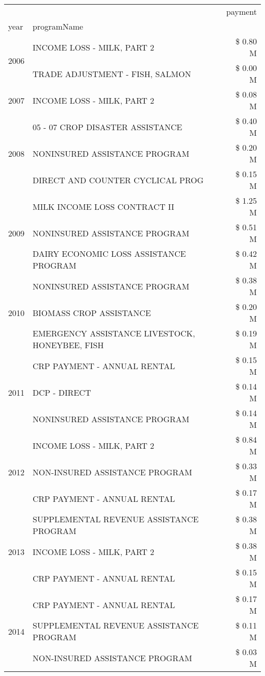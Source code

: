 \begin{tabular}{llr}
\toprule
 &  & payment \\
year & programName &  \\
\midrule
\multirow[t]{2}{*}{2006} & INCOME LOSS - MILK, PART 2 & \$ 0.80 M \\
 & TRADE ADJUSTMENT - FISH, SALMON & \$ 0.00 M \\
\cline{1-3}
2007 & INCOME LOSS - MILK, PART 2 & \$ 0.08 M \\
\cline{1-3}
\multirow[t]{3}{*}{2008} & 05 - 07 CROP DISASTER ASSISTANCE & \$ 0.40 M \\
 & NONINSURED ASSISTANCE PROGRAM & \$ 0.20 M \\
 & DIRECT AND COUNTER CYCLICAL PROG & \$ 0.15 M \\
\cline{1-3}
\multirow[t]{3}{*}{2009} & MILK INCOME LOSS CONTRACT II & \$ 1.25 M \\
 & NONINSURED ASSISTANCE PROGRAM & \$ 0.51 M \\
 & DAIRY ECONOMIC LOSS ASSISTANCE PROGRAM & \$ 0.42 M \\
\cline{1-3}
\multirow[t]{3}{*}{2010} & NONINSURED ASSISTANCE PROGRAM & \$ 0.38 M \\
 & BIOMASS CROP ASSISTANCE & \$ 0.20 M \\
 & EMERGENCY ASSISTANCE LIVESTOCK, HONEYBEE, FISH & \$ 0.19 M \\
\cline{1-3}
\multirow[t]{3}{*}{2011} & CRP PAYMENT - ANNUAL RENTAL & \$ 0.15 M \\
 & DCP - DIRECT & \$ 0.14 M \\
 & NONINSURED ASSISTANCE PROGRAM & \$ 0.14 M \\
\cline{1-3}
\multirow[t]{3}{*}{2012} & INCOME LOSS - MILK, PART 2 & \$ 0.84 M \\
 & NON-INSURED ASSISTANCE PROGRAM & \$ 0.33 M \\
 & CRP PAYMENT - ANNUAL RENTAL & \$ 0.17 M \\
\cline{1-3}
\multirow[t]{3}{*}{2013} & SUPPLEMENTAL REVENUE ASSISTANCE PROGRAM & \$ 0.38 M \\
 & INCOME LOSS - MILK, PART 2 & \$ 0.38 M \\
 & CRP PAYMENT - ANNUAL RENTAL & \$ 0.15 M \\
\cline{1-3}
\multirow[t]{3}{*}{2014} & CRP PAYMENT - ANNUAL RENTAL & \$ 0.17 M \\
 & SUPPLEMENTAL REVENUE ASSISTANCE PROGRAM & \$ 0.11 M \\
 & NON-INSURED ASSISTANCE PROGRAM & \$ 0.03 M \\

\end{tabular}

